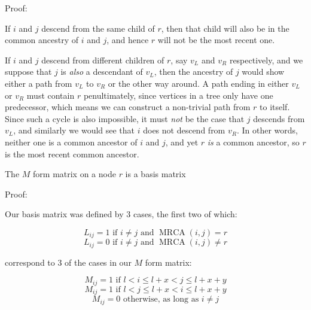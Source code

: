 \documentclass{article}
\DeclareMathOperator{\MRCA}{MRCA}
\begin{document}
Proof:

If $i$ and $j$ descend from the same child of $r$, then that child will also be in the common ancestry of $i$ and $j$, and hence $r$ will not be the most recent one.

If $i$ and $j$ descend from different children of $r$, say $v_L$ and $v_R$ respectively, and we suppose that $j$ is \emph{also} a descendant of $v_L$, then the ancestry of $j$ would show either a path from $v_L$ to $v_R$ or the other way around.
A path ending in either $v_L$ or $v_R$ must contain $r$ penultimately, since vertices in a tree only have one predecessor, which means we can construct a non-trivial path from $r$ to itself.
Since such a cycle is also impossible, it must \emph{not} be the case that $j$ descends from $v_L$, and similarly we would see that $i$ does not descend from $v_R$.
In other words, neither one is a common ancestor of $i$ and $j$, and yet $r$ \emph{is} a common ancestor, so $r$ is the most recent common ancestor.

\begin{lemma} The $M$ form matrix on a node $r$ is a basis matrix
\end{lemma}

Proof:

Our basis matrix was defined by 3 cases, the first two of which:

\begin{equation} \label{L_eqn_yes}
	L_{ij} = 1 \textrm{ if } i \neq j \textrm{ and } \MRCA(i, j) = r
\end{equation}
\begin{equation} \label{L_eqn_no}
	L_{ij} = 0 \textrm{ if } i \neq j \textrm{ and } \MRCA(i, j) \neq r
\end{equation}

correspond to 3 of the cases in our $M$ form matrix:

\begin{equation} \label{M_eqn_lr}
	M_{ij} = 1 \textrm{ if } l < i \leq l + x < j \leq l + x + y
\end{equation}
\begin{equation} \label{M_eqn_rl}
	M_{ij} = 1 \textrm{ if } l < j \leq l + x < i \leq l + x + y
\end{equation}
\begin{equation} \label{M_eqn_no}
	M_{ij} = 0 \textrm{ otherwise, as long as } i \neq j
\end{equation}
\end{document}
